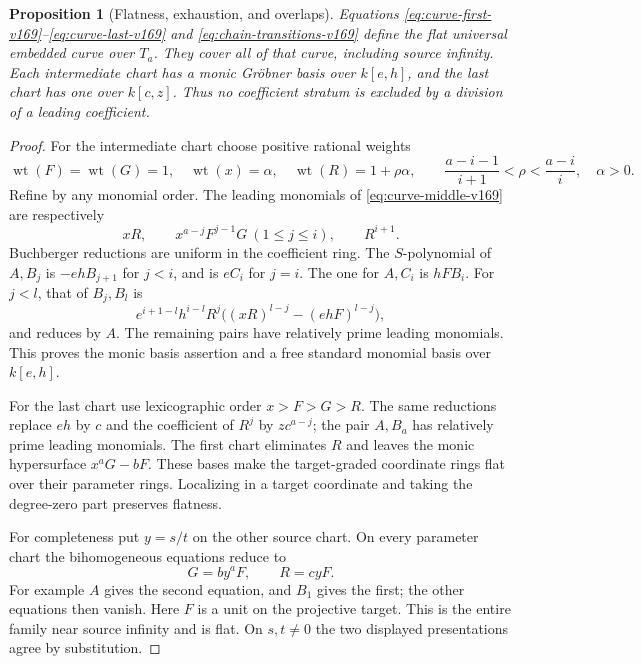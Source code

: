 \documentclass[11pt,reqno]{amsart}
\numberwithin{equation}{section}
\newtheorem{proposition}[theorem]{Proposition}
\theoremstyle{definition}\newtheorem{definition}[theorem]{Definition}
\theoremstyle{remark}\newtheorem{remark}[theorem]{Remark}
\begin{document}
\begin{proposition}[Flatness, exhaustion, and overlaps]\label{prop:curve-charts-v169}
Equations \eqref{eq:curve-first-v169}--\eqref{eq:curve-last-v169} and
\eqref{eq:chain-transitions-v169} define the flat universal embedded
curve over $T_a$. They cover all of that curve, including source
infinity. Each intermediate chart has a monic Gr\"obner basis over
$k[e,h]$, and the last chart has one over $k[c,z]$. Thus no
coefficient stratum is excluded by a division of a leading coefficient.
\end{proposition}
\begin{proof}
For the intermediate chart choose positive rational weights
\[
 \operatorname{wt}(F)=\operatorname{wt}(G)=1,\quad
 \operatorname{wt}(x)=\alpha,\quad
 \operatorname{wt}(R)=1+\rho\alpha,
 \qquad \frac{a-i-1}{i+1}<\rho<\frac{a-i}{i},\quad\alpha>0.
\]
Refine by any monomial order. The leading monomials of
\eqref{eq:curve-middle-v169} are respectively
\[
 xR,\qquad x^{a-j}F^{j-1}G\ (1\leq j\leq i),\qquad R^{i+1}.
\]
Buchberger reductions are uniform in the coefficient ring. The
$S$-polynomial of $A,B_j$ is $-ehB_{j+1}$ for $j<i$, and is $eC_i$
for $j=i$. The one for $A,C_i$ is $hFB_i$. For $j<l$, that of
$B_j,B_l$ is
\[
 e^{i+1-l}h^{i-l}R^j
       \big((xR)^{l-j}-(ehF)^{l-j}\big),
\]
and reduces by $A$. The remaining pairs have relatively prime leading
monomials. This proves the monic basis assertion and a free standard
monomial basis over $k[e,h]$.

For the last chart use lexicographic order $x>F>G>R$. The same
reductions replace $eh$ by $c$ and the coefficient of $R^j$ by
$zc^{a-j}$; the pair $A,B_a$ has relatively prime leading monomials.
The first chart eliminates $R$ and leaves the monic hypersurface
$x^aG-bF$. These bases make the target-graded coordinate rings flat
over their parameter rings. Localizing in a target coordinate and
taking the degree-zero part preserves flatness.

For completeness put $y=s/t$ on the other source chart. On every
parameter chart the bihomogeneous equations reduce to
\begin{equation}\label{eq:source-infinity-v169}
 G=b y^aF,\qquad R=c yF.
\end{equation}
For example $A$ gives the second equation, and $B_1$ gives the first;
the other equations then vanish. Here $F$ is a unit on the projective
target. This is the entire family near source infinity and is flat.
On $s,t\ne0$ the two displayed presentations agree by substitution.


\end{proof}
\end{document}
